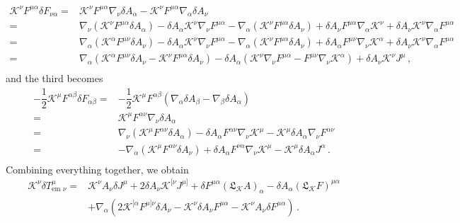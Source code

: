 \documentclass[a4paper, amsfonts, amssymb, amsmath, reprint, showkeys, nofootinbib, twoside, onecolumn,notitlepage]{revtex4-1}
\newcommand{\K}{{\mathcal{K}}}
\theoremstyle{definition}
\theoremstyle{theorem}
\begin{document}
\begin{equation}
\begin{split}
\K^{\nu} F^{\mu \alpha} \delta F_{\nu \alpha} ={}& \K^{\nu} F^{\mu \alpha} \nabla_\nu \delta A_\alpha -\K^{\nu} F^{\mu \alpha} \nabla_\alpha \delta A_\nu  \\
={}& \nabla_\nu(\K^{\nu} F^{\mu \alpha}  \delta A_\alpha)-\delta A_\alpha \K^{\nu}\nabla_\nu F^{\mu \alpha} - \nabla_\alpha(\K^{\nu} F^{\mu \alpha}  \delta A_\nu)+\delta A_\nu F^{\mu \alpha}\nabla_\alpha \K^{ \nu} +\delta A_\nu \K^{ \nu}\nabla_\alpha F^{\mu \alpha}  \\
={}& \nabla_\alpha(\K^{\alpha} F^{\mu \nu}  \delta A_\nu)-\delta A_\alpha \K^{\nu}\nabla_\nu F^{\mu \alpha} - \nabla_\alpha(\K^{\nu} F^{\mu \alpha}  \delta A_\nu)+\delta A_\alpha F^{\mu \nu}\nabla_\nu \K^{ \alpha} +\delta A_\nu \K^{ \nu}\nabla_\alpha F^{\mu \alpha}  \\
={}& \nabla_\alpha(\K^{\alpha} F^{\mu \nu}  \delta A_\nu-\K^{\nu} F^{\mu \alpha}  \delta A_\nu)-\delta A_\alpha (\K^{\nu}\nabla_\nu F^{\mu \alpha}- F^{\mu \nu}\nabla_\nu \K^{ \alpha}) +\delta A_\nu \K^{ \nu}J^\mu \, ,  \\
\end{split}
\end{equation}
and the third becomes
\begin{equation}
\begin{split}
-\dfrac{1}{2} \K^{\mu} F^{\alpha \beta}\delta F_{\alpha \beta} ={}& -\dfrac{1}{2} \K^{\mu} F^{\alpha \beta}(\nabla_\alpha \delta A_\beta -\nabla_\beta \delta A_\alpha) \\
={}&  \K^{\mu} F^{\alpha \nu} \nabla_\nu \delta A_\alpha \\
={}& \nabla_\nu( \K^{\mu} F^{\alpha \nu}  \delta A_\alpha)-\delta A_\alpha F^{\alpha \nu}\nabla_\nu \K^{ \mu} -\K^{\mu}  \delta A_\alpha \nabla_\nu F^{\alpha \nu} \\
={}& -\nabla_\alpha( \K^{\mu} F^{\alpha \nu}  \delta A_\nu)+\delta A_\alpha F^{\nu\alpha}\nabla_\nu \K^{ \mu} -\K^{\mu}  \delta A_\alpha J^\alpha \, .\\
\end{split}
\end{equation}
Combining everything together, we obtain
\begin{equation}
\begin{split}
\K^\nu \delta  T^{\mu }_{\text{em }\nu}={}&  \K^{ \nu}A_\nu \delta J^\mu  +2\delta A_\nu \K^{ [\nu}J^{\mu]}+ \delta F^{\mu \alpha} (\mathfrak{L}_{\K} A)_\alpha-\delta A_\alpha (\mathfrak{L}_{\K} F)^{\mu \alpha} \\
&+ \nabla_\alpha(2\K^{[\alpha} F^{\mu] \nu}  \delta A_\nu-\K^{\nu}  \delta A_\nu F^{\mu \alpha}-\K^{\nu} A_\nu \delta F^{\mu \alpha})  \, . \\
\end{split}  
\end{equation}
\end{document}
